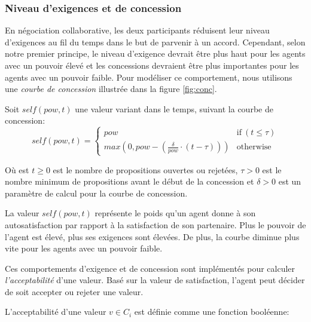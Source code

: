 			\subsubsection {Niveau d'exigences et de concession}
			
			En négociation collaborative, les deux participants réduisent leur niveau d'exigences au fil du temps dans le but de parvenir à un accord. Cependant, selon notre premier principe, le niveau d'exigence devrait être plus haut pour les agents avec un pouvoir élevé et les concessions devraient être plus importantes pour les agents avec un pouvoir faible. Pour modéliser ce comportement, nous utilisons une \emph {courbe de concession} illustrée dans la figure \ref {fig:conc}.
			
			Soit $ self (pow, t) $ une valeur variant dans le temps, suivant la courbe de concession:
				\begin{equation}
				self(pow, t) = \left\{\begin{array}{ll}
				pow & \mathrm{if\ } (t \leq \tau)\\
				max(0, pow - (\frac{\delta}{pow} \cdot (t - \tau))) & \mathrm{otherwise}
				\end{array}\right.
				\end{equation}
	
				
			Où est $ t \geq 0 $ est le nombre de propositions ouvertes ou rejetées, $ \tau> 0 $ est le nombre minimum de propositions avant le début de la concession et $ \delta> 0 $ est un paramètre de calcul pour la courbe de concession.
		
		La valeur $ self (pow, t) $ représente le poids qu'un agent donne à son autosatisfaction par rapport à la satisfaction de son partenaire. Plus le pouvoir de l'agent est élevé, plus ses exigences sont élevées. De plus, la courbe diminue plus vite pour les agents avec un pouvoir faible.
		
		Ces comportements d'exigence et de concession sont implémentés pour calculer \textit{l'acceptabilité} d'une valeur. Basé sur la valeur de satisfaction, l'agent peut décider de soit accepter ou rejeter une valeur.
		
		L'acceptabilité d'une valeur $ v \in C_i $ est définie comme une fonction booléenne:	
		
